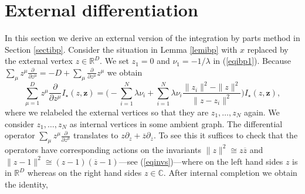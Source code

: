 \documentclass[oneside]{amsart}
\newcommand{\CC}{{\mathbb C}}
\newcommand{\RR}{{\mathbb R}}
\newcommand{\zz}{{\overline{z}}}
\theoremstyle{plain}
\begin{document}
\section{External differentiation}\label{sectextdiff}
In this section we derive an external version of the integration by parts method in Section \ref{sectibp}.
Consider the situation in Lemma \ref{lemibp} with $x$ replaced by the external vertex $z\in\RR^D$. We set $z_1=0$ and $\nu_1=-1/\lambda$ in (\ref{eqibp1}).
Because $\sum_\mu z^\mu\frac{\partial}{\partial z^\mu}=-D+\sum_\mu\frac{\partial}{\partial z^\mu}z^\mu$ we obtain
\begin{equation}\label{eqextibp}
\sum_{\mu=1}^Dz^\mu\frac{\partial}{\partial z^\mu}I_\star(z,{\mathbf z})=\Big(-\sum_{i=1}^N\lambda\nu_i+\sum_{i=1}^N\lambda\nu_i
\frac{\|z_i\|^2-\|z\|^2}{\|z-z_i\|^2}\Big)I_\star(z,{\mathbf z}),
\end{equation}
where we relabeled the external vertices so that they are $z_1,\ldots,z_N$ again. We consider $z_1,\ldots,z_N$ as internal vertices in some ambient graph.
The differential operator $\sum_\mu z^\mu\frac{\partial}{\partial z^\mu}$ translates to $z\partial_z+\zz\partial_\zz$. To see this it suffices to check that
the operators have corresponding actions on the invariants $\|z\|^2\cong z\zz$ and $\|z-1\|^2\cong (z-1)(\zz-1)$---see (\ref{eqinvs})---where on the left hand sides $z$ is in $\RR^D$ whereas
on the right hand sides $z\in\CC$.
After internal completion we obtain the identity,
\end{document}
